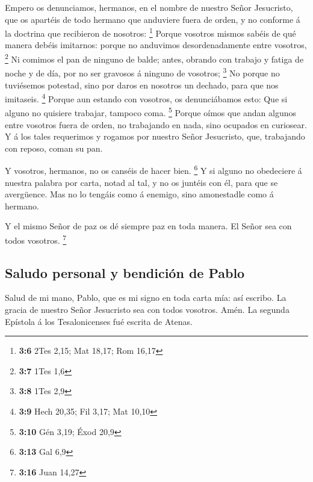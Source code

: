  Empero os denunciamos, hermanos, en el nombre de nuestro
Señor Jesucristo, que os apartéis de todo hermano que anduviere fuera de
orden, y no conforme á la doctrina que recibieron de nosotros:
\footnote{\textbf{3:6} 2Tes 2,15; Mat 18,17; Rom 16,17} 
Porque vosotros mismos sabéis de qué manera debéis imitarnos: porque no
anduvimos desordenadamente entre vosotros, \footnote{\textbf{3:7} 1Tes
  1,6}  Ni comimos el pan de ninguno de balde; antes,
obrando con trabajo y fatiga de noche y de día, por no ser gravosos á
ninguno de vosotros; \footnote{\textbf{3:8} 1Tes 2,9}  No
porque no tuviésemos potestad, sino por daros en nosotros un dechado,
para que nos imitaseis. \footnote{\textbf{3:9} Hech 20,35; Fil 3,17; Mat
  10,10}  Porque aun estando con vosotros, os denunciábamos
esto: Que si alguno no quisiere trabajar, tampoco coma. \footnote{\textbf{3:10}
  Gén 3,19; Éxod 20,9}  Porque oímos que andan algunos
entre vosotros fuera de orden, no trabajando en nada, sino ocupados en
curiosear.  Y á los tales requerimos y rogamos por nuestro
Señor Jesucristo, que, trabajando con reposo, coman su pan.

 Y vosotros, hermanos, no os canséis de hacer bien.
\footnote{\textbf{3:13} Gal 6,9}  Y si alguno no obedeciere
á nuestra palabra por carta, notad al tal, y no os juntéis con él, para
que se avergüence.  Mas no lo tengáis como á enemigo, sino
amonestadle como á hermano.

 Y el mismo Señor de paz os dé siempre paz en toda manera.
El Señor sea con todos vosotros. \footnote{\textbf{3:16} Juan 14,27}

\hypertarget{saludo-personal-y-bendiciuxf3n-de-pablo}{%
\subsection{Saludo personal y bendición de
Pablo}\label{saludo-personal-y-bendiciuxf3n-de-pablo}}

 Salud de mi mano, Pablo, que es mi signo en toda carta
mía: así escribo.  La gracia de nuestro Señor Jesucristo
sea con todos vosotros. Amén. La segunda Epístola á los Tesalonicenses
fué escrita de Atenas.
